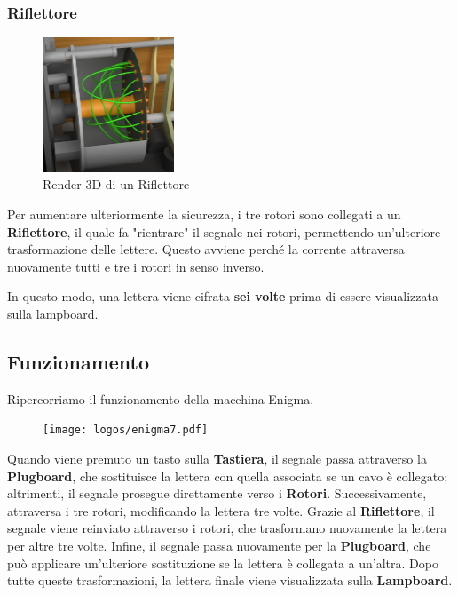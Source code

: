 \documentclass{rapport}
\begin{document}
\subsubsection{Riflettore}
\begin{figure}
    \vspace{-1cm}
    \centering
    \includegraphics[width=0.35\textwidth]{logos/Screenshot from 2025-02-10 17-26-46.png}
    \caption*{Render 3D di un Riflettore}
\end{figure}

Per aumentare ulteriormente la sicurezza, i tre rotori sono collegati a un \textbf{Riflettore}, il quale fa "rientrare" il segnale nei rotori, permettendo un'ulteriore trasformazione delle lettere. Questo avviene perché la corrente attraversa nuovamente tutti e tre i rotori in senso inverso.

In questo modo, una lettera viene cifrata \textbf{sei volte} prima di essere visualizzata sulla lampboard.

\afterpage{\clearpage}  


\newpage
\subsection{Funzionamento}
Ripercorriamo il funzionamento della macchina Enigma. 

\begin{figure}[h]
    \centering
    \texttt{[image: logos/enigma7.pdf]}
\end{figure}

Quando viene premuto un tasto sulla \textbf{Tastiera}, il segnale passa attraverso la \textbf{Plugboard}, che sostituisce la lettera con quella associata se un cavo è collegato; altrimenti, il segnale prosegue direttamente verso i \textbf{Rotori}. Successivamente, attraversa i tre rotori, modificando la lettera tre volte. Grazie al \textbf{Riflettore}, il segnale viene reinviato attraverso i rotori, che trasformano nuovamente la lettera per altre tre volte. Infine, il segnale passa nuovamente per la \textbf{Plugboard}, che può applicare un'ulteriore sostituzione se la lettera è collegata a un'altra. Dopo tutte queste trasformazioni, la lettera finale viene visualizzata sulla \textbf{Lampboard}. 
\end{document}
